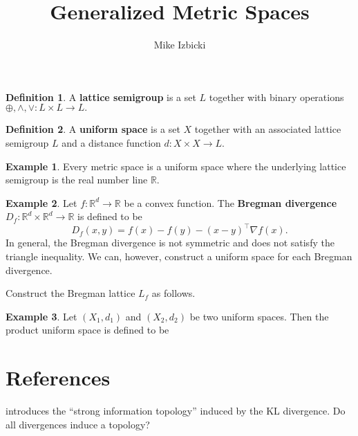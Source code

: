 \documentclass{article}
\title{Generalized Metric Spaces}
\author{Mike Izbicki}
\theoremstyle{definition}
\newtheorem{definition}{Definition}
\newtheorem{example}{Example}
\newcommand{\defn}[1]{\textbf{#1}}
\newcommand{\grad}{\nabla\!}
\newcommand{\R}{\mathbb{R}}
\newcommand{\trans}[1]{{#1}^{\top}}
\newcommand{\+}{\oplus}
\newcommand{\meet}{\wedge}
\newcommand{\join}{\vee}
\newcommand{\dist}{d}
\newcommand{\breg}{D}
\begin{document}
\maketitle


\begin{definition}
    A \defn{lattice semigroup} is a set $L$ together with binary operations $\+,\meet,\join : L\times L\to L.$
\end{definition}

\begin{definition}
    A \defn{uniform space} is a set $X$ together with an associated lattice semigroup $L$ and a distance function $\dist : X\times X\to L$.
\end{definition}

\begin{example}
    Every metric space is a uniform space where the underlying lattice semigroup is the real number line $\R$.
\end{example}

\begin{example}
    Let $f : \R^d \to \R$ be a convex function.
    The \defn{Bregman divergence} $\breg_f : \R^d\times\R^d\to\R$ is defined to be
    \begin{equation}
        \breg_f(x,y) = f(x)-f(y) - \trans{(x-y)}\grad f(x)
        .
    \end{equation}
    In general, the Bregman divergence is not symmetric and does not satisfy the triangle inequality.
    We can, however, construct a uniform space for each Bregman divergence.

    Construct the Bregman lattice $L_f$ as follows.
\end{example}

\begin{example}
    Let $(X_1,\dist_1)$ and $(X_2,\dist_2)$ be two uniform spaces.
    Then the product uniform space is defined to be
\end{example}


\section{References}

\citet{harremoes2007information} introduces the ``strong information topology'' induced by the KL divergence.
Do all divergences induce a topology?


\clearpage


\end{document}
